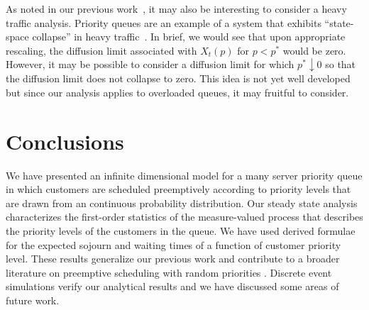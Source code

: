 \documentclass[conference]{IEEEtran}
\begin{document}
As noted in our previous work~\cite{Master_ACC_2017}, it may also be
interesting to consider a heavy traffic analysis. Priority queues are
an example of a system that exhibits ``state-space collapse'' in heavy
traffic~\cite{Reiman_1984}. In brief, we would see that upon
appropriate rescaling, the diffusion limit associated with $X_t(p)$
for $p < p^*$ would be zero. However, it may be possible to consider a
diffusion limit for which $p^* \downarrow 0$ so that the diffusion
limit does not collapse to zero. This idea is not yet well developed
but since our analysis applies to overloaded queues, it may fruitful
to consider.

\section{Conclusions\label{sec:conclusions}}
We have presented an infinite dimensional model for a many server
priority queue in which customers are scheduled preemptively according
to priority levels that are drawn from an continuous probability
distribution. Our steady state analysis characterizes the first-order
statistics of the measure-valued process that describes the priority
levels of the customers in the queue. We have used derived formulae
for the expected sojourn and waiting times of a function of customer
priority level. These results generalize our previous work
\cite{Master_ACC_2017} and contribute to a broader literature on
preemptive scheduling with random priorities
\cite{Haviv_2016}. Discrete event simulations verify our analytical
results and we have discussed some areas of future work.



\end{document}
